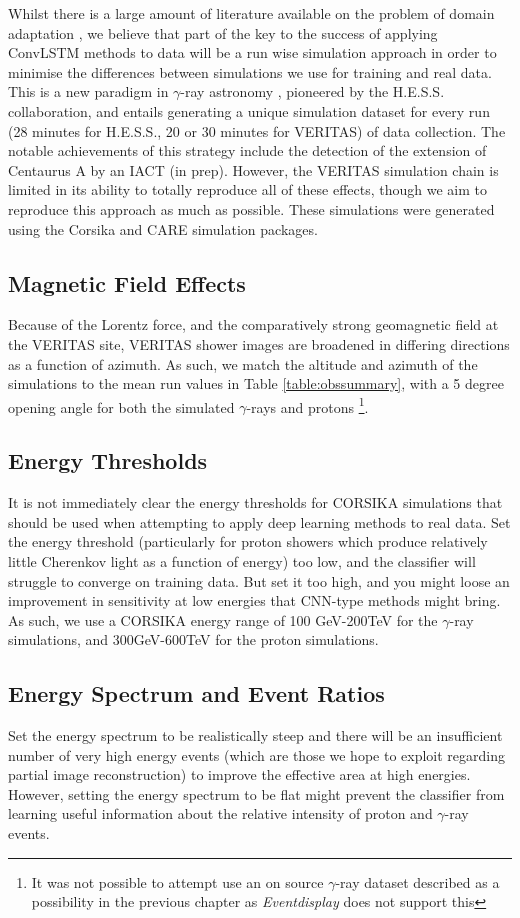 Whilst there is a large amount of literature available on the problem of domain adaptation \cite{ada}, we believe that part of the key to the success of applying ConvLSTM methods to data will be a run wise simulation approach in order to minimise the differences between simulations we use for training and real data. This is a new paradigm in $\gamma$-ray astronomy \cite{rws}, pioneered by the H.E.S.S. collaboration, and entails generating a unique simulation dataset for every run (28 minutes for H.E.S.S., 20 or 30 minutes for VERITAS) of data collection. The notable achievements of this strategy include the detection of the extension of Centaurus A by an IACT (in prep). However, the VERITAS simulation chain is limited in its ability to totally reproduce all of these effects, though we aim to reproduce this approach as much as possible. These simulations were generated using the Corsika and CARE simulation packages.

\subsection{Magnetic Field Effects}
Because of the Lorentz force, and the comparatively strong geomagnetic field at the VERITAS site, VERITAS shower images are broadened in differing directions as a function of azimuth. As such, we match the altitude and azimuth of the simulations to the mean run values in Table \ref{table:obssummary}, with a 5 degree opening angle for both the simulated $\gamma$-rays and protons \footnote{It was not possible to attempt use an on source $\gamma$-ray dataset described as a possibility in the previous chapter as \textit{Eventdisplay} does not support this}.
\subsection{Energy Thresholds}
It is not immediately clear the energy thresholds for CORSIKA simulations that should be used when attempting to apply deep learning methods to real data. Set the energy threshold (particularly for proton showers which produce relatively little Cherenkov light as a function of energy) too low, and the classifier will struggle to converge on training data. But set it too high, and you might loose an improvement in sensitivity at low energies that CNN-type methods might bring. As such, we use a CORSIKA energy range of 100 GeV-200TeV for the $\gamma$-ray simulations, and 300GeV-600TeV for the proton simulations.

\subsection{Energy Spectrum and Event Ratios}
Set the energy spectrum to be realistically steep and there will be an insufficient number of very high energy events (which are those we hope to exploit regarding partial image reconstruction) to improve the effective area at high energies. However, setting the energy spectrum to be flat might prevent the classifier from learning useful information about the relative intensity of proton and $\gamma$-ray events.

